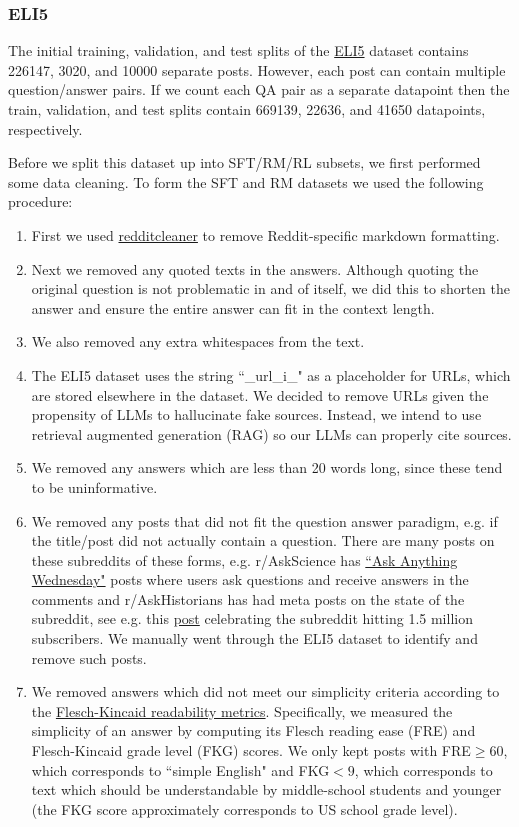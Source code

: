 \documentclass[11pt, oneside]{article}   	%
\begin{document}
\subsubsection{ELI5}
The initial training, validation, and test splits of the \href{https://huggingface.co/datasets/vblagoje/lfqa}{ELI5} dataset contains 226147, 3020, and 10000 separate posts. 
However, each post can contain multiple question/answer pairs.
If we count each QA pair as a separate datapoint then the train, validation, and test splits contain 669139, 22636, and 41650 datapoints, respectively.

Before we split this dataset up into SFT/RM/RL subsets, we first performed some data cleaning.
To form the SFT and RM datasets we used the following procedure:
\begin{enumerate}
\item First we used \href{https://pypi.org/project/redditcleaner/}{redditcleaner} to remove Reddit-specific markdown formatting.
\item Next we removed any quoted texts in the answers. Although quoting the original question is not problematic in and of itself, we did this to shorten the answer and ensure the entire answer can fit in the context length.
\item We also removed any extra whitespaces from the text.
\item The ELI5 dataset uses the string ``\_url\_i\_" as a placeholder for URLs, which are stored elsewhere in the dataset. 
We decided to remove URLs given the propensity of LLMs to hallucinate fake sources.
Instead, we intend to use retrieval augmented generation (RAG) so our LLMs can properly cite sources.
\item We removed any answers which are less than 20 words long, since these tend to be uninformative. 
\item We removed any posts that did not fit the question answer paradigm, e.g. if the title/post did not actually contain a question.
There are many posts on these subreddits of these forms, e.g. r/AskScience has \href{https://www.reddit.com/r/askscience/comments/10wyuf9/ask_anything_wednesday_engineering_mathematics/}{``Ask Anything Wednesday"} posts where users ask questions and receive answers in the comments and r/AskHistorians has had meta posts on the state of the subreddit, see e.g. this \href{https://www.reddit.com/r/AskHistorians/comments/yfs7uh/askhistorians_has_hit_15_million_subscribers_to/}{post} celebrating the subreddit hitting 1.5 million subscribers. We manually went through the ELI5 dataset to identify and remove such posts.
\item We removed answers which did not meet our simplicity criteria according to the \href{https://en.wikipedia.org/wiki/Flesch\%E2\%80\%93Kincaid_readability_tests}{Flesch-Kincaid readability metrics}. Specifically, we measured the simplicity of an answer by computing its Flesch reading ease (FRE) and Flesch-Kincaid grade level (FKG) scores. We only kept posts with FRE$\geq 60$, which corresponds to ``simple English" and FKG$< 9$, which corresponds to text which should be understandable by middle-school students and younger (the FKG score approximately corresponds to US school grade level). 
\end{enumerate}
\end{document}
